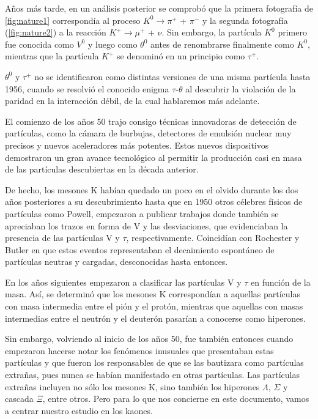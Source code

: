 

Años más tarde, en un análisis posterior se comprobó que la primera fotografía de \ref{fig:nature1} correspondía al proceso  $K^0 \rightarrow \pi^+$ +  $\pi^- $ y la segunda fotografía (\ref{fig:nature2}) a la reacción $K^+ \rightarrow \mu^+$ + $\nu $. Sin embargo, la partícula $K^0$ primero fue conocida como $V^0$ y luego como $\theta^0$ antes de renombrarse finalmente como $K^0$, mientras que la partícula $K^+$ se denominó en un principio como $\tau^+$. 

$\theta^0$ y $\tau^+$ no se identificaron como distintas versiones de una misma partícula hasta 1956, cuando se resolvió el conocido enigma $\tau$-$\theta$ al descubrir la violación de la paridad en la interacción débil, de la cual hablaremos más adelante.

El comienzo de los años 50 trajo consigo técnicas innovadoras de detección de partículas, como la cámara de burbujas, detectores de emulsión nuclear muy precisos y nuevos aceleradores más potentes. Estos nuevos dispositivos demostraron un gran avance tecnológico al permitir la producción casi en masa de las partículas descubiertas en la década anterior. 

De hecho, los mesones K habían quedado un poco en el olvido durante los dos años posteriores a su descubrimiento hasta que en 1950 otros célebres físicos de partículas como Powell, empezaron a publicar trabajos donde también se apreciaban los trazos en forma de V y las desviaciones, que evidenciaban la presencia de las partículas V y $\tau$, respectivamente. Coincidían con Rochester y Butler en que estos eventos representaban el decaimiento espontáneo de partículas neutras y cargadas, desconocidas hasta entonces. 

En los años siguientes empezaron a clasificar las partículas V y $\tau$ en función de la masa. Así, se determinó que los mesones K correspondían a aquellas partículas con masa intermedia entre el pión y el protón, mientras que aquellas con masas intermedias entre el neutrón y el deuterón pasarían a conocerse como hiperones. 

Sin embargo, volviendo al inicio de los años 50, fue también entonces cuando empezaron hacerse notar los fenómenos inusuales que presentaban estas partículas y que fueron los responsables de que se las bautizara como partículas extrañas, pues nunca se habían manifestado en otras partículas. Las partículas extrañas incluyen no sólo los mesones K, sino también los hiperones $\Lambda$, $\Sigma$ y cascada $\Xi$, entre otros. Pero para lo que nos concierne en este documento, vamos a centrar nuestro estudio en los kaones.

